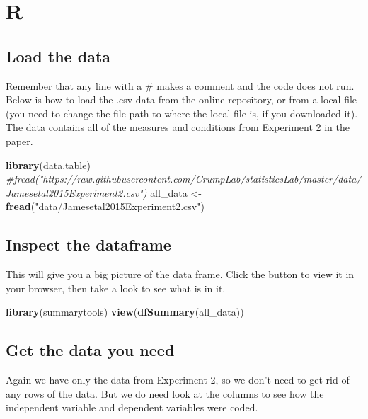 \documentclass[]{book}
\newenvironment{Shaded}{\begin{snugshade}}{\end{snugshade}}
\newcommand{\KeywordTok}[1]{\textcolor[rgb]{0.13,0.29,0.53}{\textbf{{#1}}}}
\newcommand{\StringTok}[1]{\textcolor[rgb]{0.31,0.60,0.02}{{#1}}}
\newcommand{\CommentTok}[1]{\textcolor[rgb]{0.56,0.35,0.01}{\textit{{#1}}}}
\newcommand{\NormalTok}[1]{{#1}}
\theoremstyle{definition}
\theoremstyle{definition}
\theoremstyle{definition}
\theoremstyle{remark}
\begin{document}
\section{R}\label{r-8}

\subsection{Load the data}\label{load-the-data-2}

Remember that any line with a \# makes a comment and the code does not
run. Below is how to load the .csv data from the online repository, or
from a local file (you need to change the file path to where the local
file is, if you downloaded it). The data contains all of the measures
and conditions from Experiment 2 in the paper.

\begin{Shaded}
\begin{Highlighting}[]
\KeywordTok{library}\NormalTok{(data.table)}
\CommentTok{#fread("https://raw.githubusercontent.com/CrumpLab/statisticsLab/master/data/Jamesetal2015Experiment2.csv")}
\NormalTok{all_data <-}\StringTok{ }\KeywordTok{fread}\NormalTok{(}\StringTok{"data/Jamesetal2015Experiment2.csv"}\NormalTok{)}
\end{Highlighting}
\end{Shaded}

\subsection{Inspect the dataframe}\label{inspect-the-dataframe}

This will give you a big picture of the data frame. Click the button to
view it in your browser, then take a look to see what is in it.

\begin{Shaded}
\begin{Highlighting}[]
\KeywordTok{library}\NormalTok{(summarytools)}
\KeywordTok{view}\NormalTok{(}\KeywordTok{dfSummary}\NormalTok{(all_data))}
\end{Highlighting}
\end{Shaded}

\subsection{Get the data you need}\label{get-the-data-you-need}

Again we have only the data from Experiment 2, so we don't need to get
rid of any rows of the data. But we do need look at the columns to see
how the independent variable and dependent variables were coded.
\end{document}
